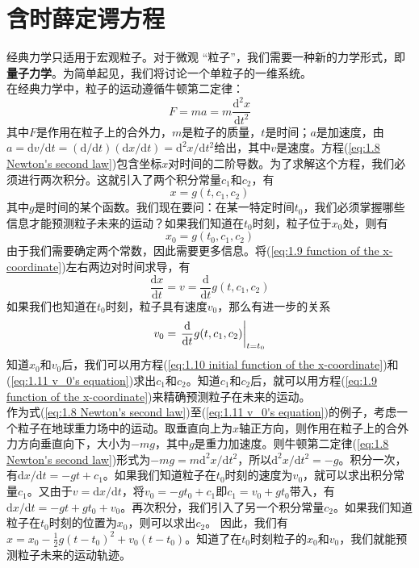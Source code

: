 	\section{含时薛定谔方程}
	经典力学只适用于宏观粒子。对于微观 “粒子”，我们需要一种新的力学形式，即\textbf{量子力学}。为简单起见，我们将讨论一个单粒子的一维系统。\\
	\indent 在经典力学中，粒子的运动遵循牛顿第二定律：
	\begin{equation}
		\boxed{F = ma = m \frac{\text{d}^2x}{\text{d}t^2}}
		\label{eq:1.8 Newton's second law}
	\end{equation}
	其中$F$是作用在粒子上的合外力，$m$是粒子的质量，$t$是时间；$a$是加速度，由$a = \text{d} v / \text{d}t = \left(\text{d} / \text{d}t\right)\left(\text{d}x / \text{d}t\right) = \text{d}^2x / \text{d} t^2$给出，其中$v$是速度。方程(\ref{eq:1.8 Newton's second law})包含坐标$x$对时间的二阶导数。为了求解这个方程，我们必须进行两次积分。这就引入了两个积分常量$c_1$和$c_2$，有
	\begin{equation}
		x=g\left(t,c_1,c_2\right)
		\label{eq:1.9 function of the x-coordinate}
	\end{equation}
	其中$g$是时间的某个函数。我们现在要问：在某一特定时间$t_0$，我们必须掌握哪些信息才能预测粒子未来的运动？如果我们知道在$t_0$时刻，粒子位于$x_0$处，则有
	\begin{equation}
		x_0=g\left(t_0,c_1,c_2\right)
		\label{eq:1.10 initial function of the x-coordinate}
	\end{equation}
	由于我们需要确定两个常数，因此需要更多信息。将(\ref{eq:1.9 function of the x-coordinate})左右两边对时间求导，有
	\begin{equation*}
		\frac{\text{d} x }{\text{d}t} = v = \frac{\text{d}}{\text{d} t} g\left(t,c_1,c_2\right)
		\label{eq*:derivative of g function with respect to time}
	\end{equation*}
	如果我们也知道在$t_0$时刻，粒子具有速度$v_0$，那么有进一步的关系
	\begin{equation}
		v_0 = \eval{\frac{\mathrm{d}}{\mathrm{d} t} g(t, c_1, c_2)}_{t = t_0}
		\label{eq:1.11 v_0's equation}
	\end{equation}
	知道$x_0$和$v_0$后，我们可以用方程(\ref{eq:1.10 initial function of the x-coordinate})和(\ref{eq:1.11 v_0's equation})求出$c_1$和$c_2$。知道$c_1$和$c_2$后，就可以用方程(\ref{eq:1.9 function of the x-coordinate})来精确预测粒子在未来的运动。\\
	 \indent 作为式(\ref{eq:1.8 Newton's second law})至(\ref{eq:1.11 v_0's equation})的例子，考虑一个粒子在地球重力场中的运动。取垂直向上为$x$轴正方向，则作用在粒子上的合外力方向垂直向下，大小为$-mg$，其中$g$是重力加速度。则牛顿第二定律(\ref{eq:1.8 Newton's second law})形式为$-mg=m\mathrm{d}^2x/\mathrm{d}t^2$，所以$\mathrm{d}^2x/\mathrm{d}t^2=-g$。积分一次，有$\mathrm{d}x/\mathrm{d}t=-gt+c_1$。如果我们知道粒子在$t_0$时刻的速度为$v_0$，就可以求出积分常量$c_1$。又由于$v=\mathrm{d}x/\mathrm{d}t$，将$v_0=-gt_0+c_1$即$c_1=v_0+gt_0$带入，有$\mathrm{d}x/\mathrm{d}t=-gt+gt_0+v_0$。再次积分，我们引入了另一个积分常量$c_2$。如果我们知道粒子在$t_0$时刻的位置为$x_0$，则可以求出$c_2$。	因此，我们有$x=x_0-\frac{1}{2}g\left(t-t_0\right)^2+v_0\left(t-t_0\right)$。知道了在$t_0$时刻粒子的$x_0$和$v_0$，我们就能预测粒子未来的运动轨迹。\\

